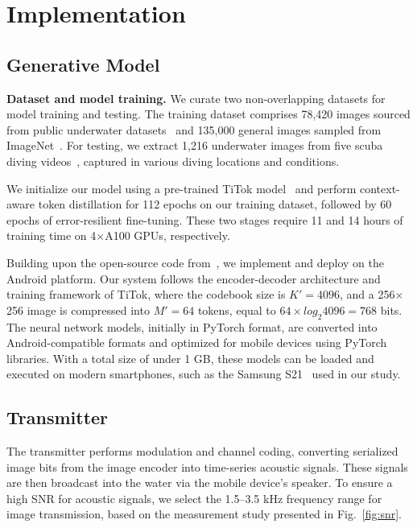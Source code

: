 \section{Implementation}\label{sec:implementation}

\subsection{Generative Model}

\noindent\textbf{Dataset and model training.}
We curate two non-overlapping datasets for model training and testing.
The training dataset comprises 78,420 images sourced from public underwater
datasets~\cite{anantharajah2014local, marques2020l2uwe, islam2020suim,
islam2019fast, jmse7010016, 2018arXiv180704856G, li2019underwater, 10102831} and
135,000 general images sampled from ImageNet~\cite{imagenet100}.
For testing, we extract 1,216 underwater images from five scuba diving
videos~\cite{dataset_video_1, dataset_video_2, dataset_video_3, dataset_video_4,
dataset_video_5}, captured in various diving locations and conditions.

We initialize our model using a pre-trained TiTok model~\cite{yu2024image} and perform context-aware token distillation for 112 epochs on our training dataset,
followed by 60 epochs of error-resilient fine-tuning.
These two stages require 11 and 14 hours of training time on 4$\times$A100 GPUs,
respectively.

 Building upon the open-source code from~\cite{chen2022underwater}, we implement and deploy \sysname on the Android platform.
Our system follows the encoder-decoder architecture and training framework of TiTok,
where the codebook size is $K'=4096$, and a 256$\times$256 image is compressed into $M'=64$ tokens, equal to $64\times log_2{4096} = 768$ bits.
The neural network models, initially in PyTorch format, are converted into Android-compatible formats and optimized for mobile devices using PyTorch~\cite{pytorch_mobile} libraries.
With a total size of under 1 GB, these models can be loaded and executed
on modern smartphones, such as the Samsung S21~\cite{Samsung} used in our study.




\subsection{Transmitter}
The transmitter performs modulation and channel coding, converting serialized image bits from the image encoder into time-series acoustic signals. These signals are then broadcast into the water via the mobile device's speaker.
To ensure a high SNR for acoustic signals,
we select the 1.5--3.5 kHz frequency range for image transmission,
based on the measurement study presented in Fig.~\ref{fig:snr}.




